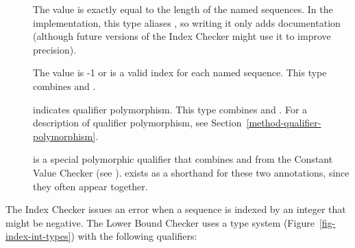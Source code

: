 \begin{description}
 \item[]
   The value is exactly equal to the length of the named
   sequences. In the implementation, this type aliases
   , so writing it
   only adds documentation (although future versions of the Index Checker
   might use it to improve precision).

 \item[]
   The value is -1 or is a valid index for
   each named sequence.  This type combines
   and
  .

%
%

 \item[]
   indicates qualifier polymorphism.  This type combines
    and
   .
   For a description of qualifier polymorphism, see
   Section~\ref{method-qualifier-polymorphism}.

 \item[]
   is a special polymorphic qualifier that combines
    and
    from the
   Constant Value Checker (see ).
    exists
   as a shorthand for these two annotations, since
   they often appear together.

\end{description}


The Index Checker issues an error when
a sequence is indexed by an integer that might be negative.
The Lower Bound Checker uses a type system (Figure~\ref{fig-index-int-types}) with the following
qualifiers:

